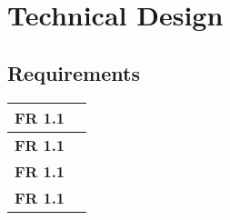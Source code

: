  \section{Technical Design}\label{sec:technical}

  \subsection*{Requirements}

  \begin{table}[H]
    \begin{tabular}{| p{1.5cm} | p{10cm} |}
      \hline
      {\bf FR 1.1} & \\ \hline
      {\bf FR 1.1} & \\ \hline
      {\bf FR 1.1} & \\ \hline
      {\bf FR 1.1} & \\ \hline

    \end{tabular}
  \end{table}